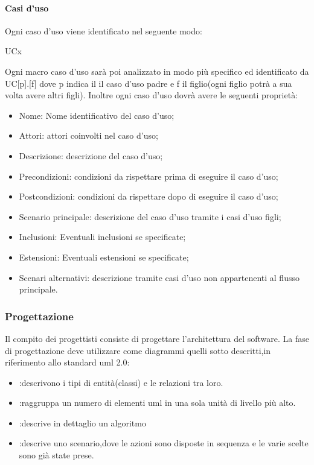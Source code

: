 		\paragraph{Casi d'uso}
		Ogni caso d'uso viene identificato nel seguente modo:
		\centerline{UCx}
		Ogni macro caso d'uso sarà poi analizzato in modo più specifico ed identificato da UC[p].[f] dove p indica il il caso d'uso padre e f il figlio(ogni figlio potrà a sua volta avere altri figli).
		Inoltre ogni caso d'uso dovrà avere le seguenti proprietà:
		\begin{itemize}
		\item Nome: Nome identificativo del caso d'uso;
		\item Attori: attori coinvolti nel caso d'uso;
		\item Descrizione: descrizione del caso d'uso;
		\item Precondizioni: condizioni da rispettare prima di eseguire il caso d'uso;%
		\item Postcondizioni: condizioni da rispettare dopo di eseguire il caso d'uso;%
		\item Scenario principale: descrizione del caso d'uso tramite i casi d'uso figli;
		\item Inclusioni: Eventuali inclusioni se specificate;
		\item Estensioni: Eventuali estensioni se specificate;
		\item Scenari alternativi: descrizione tramite casi d'uso non appartenenti al flusso principale.
		\end{itemize}
	\subsubsection{Progettazione}
	Il compito dei progettisti consiste di progettare l'architettura del software. %
	La fase di progettazione deve utilizzare come diagrammi  quelli sotto descritti,in riferimento allo standard uml 2.0:
	\begin{itemize}
		\item {}:descrivono i tipi di entità(classi) e le relazioni tra loro.
		\item {}:raggruppa un numero di elementi uml in una sola unità di livello più alto.
		\item {}:descrive in dettaglio un algoritmo
		\item {}:descrive uno scenario,dove le azioni sono disposte in sequenza e le varie scelte sono già state prese.
		\end{itemize}
